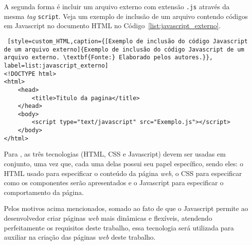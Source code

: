 
A segunda forma é incluir um arquivo externo com extensão \texttt{.js} através da mesma \textit{tag} \texttt{script}. Veja um exemplo de inclusão de um arquivo contendo códigos em Javascript no documento HTML no Código~\ref{list:javascript_externo}.

\begin{lstlisting} [style=custom_HTML,caption={[Exemplo de inclusão do código Javascript de um arquivo externo]{Exemplo de inclusão do código Javascript de um arquivo externo. \textbf{Fonte:} Elaborado pelos autores.}}, label=list:javascript_externo] 	
<!DOCTYPE html>
<html>
	<head>
		<title>Titulo da pagina</title>
	</head>
	<body>
		<script type="text/javascript" src="Exemplo.js"></script>
	</body>
</html>
\end{lstlisting}


Para , as três tecnologias (HTML, CSS e Javascript) devem ser usadas em conjunto, uma vez que, cada uma delas possui seu papel específico, sendo eles: o HTML usado para especificar o conteúdo da página \textit{web}, o CSS para especificar como os componentes serão apresentados e o Javascript para especificar o comportamento da página.

Pelos motivos acima mencionados, somado ao fato de que o Javascript permite ao desenvolvedor criar páginas \textit{web} mais dinâmicas e flexíveis, atendendo perfeitamente os requisitos deste trabalho, essa tecnologia será utilizada para auxiliar na criação das páginas \textit{web} deste trabalho.